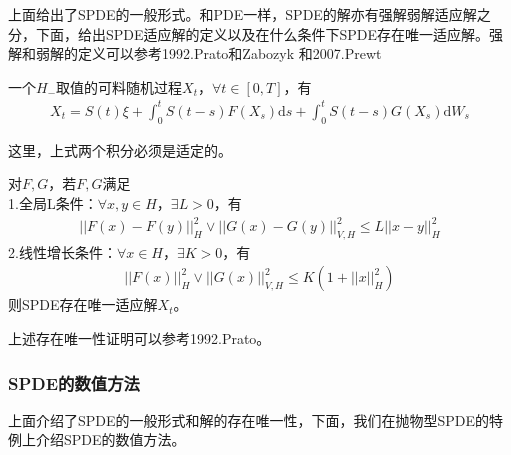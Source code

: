             \par
            上面给出了SPDE的一般形式。和PDE一样，SPDE的解亦有强解弱解适应解之分，下面，给出SPDE适应解的定义以及在什么条件下SPDE存在唯一适应解。强解和弱解的定义可以参考1992.Prato和Zabozyk\cite{1992.Prato} 和2007.Prewt\cite{2007.Prewt}
            \begin{definition}[适应解]
                一个$H_-$取值的可料随机过程$X_t$，$\forall t\in[0,T]$，有
                \begin{align*}
                    X_t = S(t)\xi + \int_0^t S(t-s)F(X_s)\mathrm{d}s+\int_0^t S(t-s)G(X_s)\mathrm{d}W_s
                \end{align*}
            \end{definition}
            这里，上式两个积分必须是适定的。
            \begin{theorem}[适应解的存在唯一性]
                对$F,G$，若$F,G$满足\\
                1.全局L条件：$\forall x,y\in H$，$\exists L >0$，有
                \begin{align*}
                ||F(x) - F(y)||_H^2 \vee ||G(x) - G(y)||_{V,H}^2 \leqslant L||x-y||_H^2
                \end{align*}
                2.线性增长条件：$\forall x \in H$，$\exists K>0$，有
                \begin{align*}
                ||F(x)||_H^2 \vee ||G(x)||_{V,H}^2 \leqslant K(1+ ||x||_H^2)
                \end{align*}
                则SPDE存在唯一适应解$X_t$。
            \end{theorem}
            上述存在唯一性证明可以参考1992.Prato\cite{1992.Prato}。

        \subsubsection{SPDE的数值方法}
            \par
            上面介绍了SPDE的一般形式和解的存在唯一性，下面，我们在抛物型SPDE的特例上介绍SPDE的数值方法。
